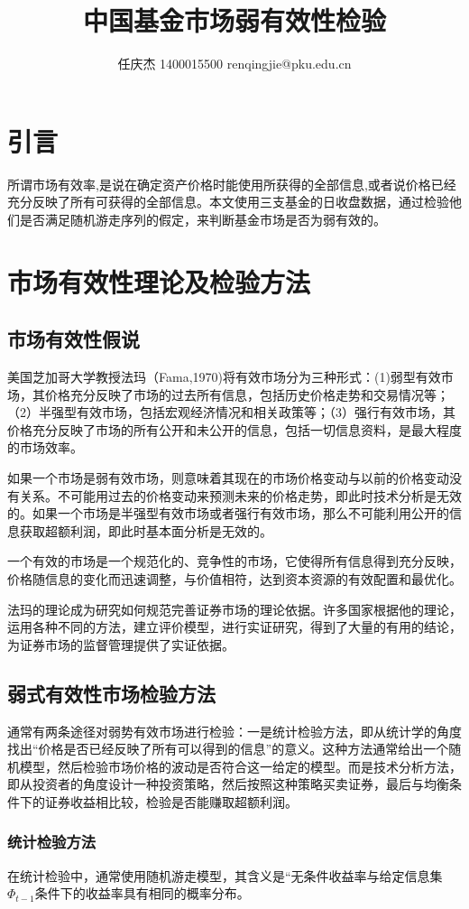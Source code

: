 \documentclass[11pt]{article}
\author{任庆杰 1400015500 renqingjie@pku.edu.cn}
\title{中国基金市场弱有效性检验}
\begin{document}
\maketitle
\section*{引言}
所谓市场有效率,是说在确定资产价格时能使用所获得的全部信息,或者说价格已经充分反映了所有可获得的全部信息。本文使用三支基金的日收盘数据，通过检验他们是否满足随机游走序列的假定，来判断基金市场是否为弱有效的。

\section{市场有效性理论及检验方法}
\subsection{市场有效性假说}
美国芝加哥大学教授法玛（Fama,1970)将有效市场分为三种形式：(1)弱型有效市场，其价格充分反映了市场的过去所有信息，包括历史价格走势和交易情况等；（2）半强型有效市场，包括宏观经济情况和相关政策等；（3）强行有效市场，其价格充分反映了市场的所有公开和未公开的信息，包括一切信息资料，是最大程度的市场效率。

如果一个市场是弱有效市场，则意味着其现在的市场价格变动与以前的价格变动没有关系。不可能用过去的价格变动来预测未来的价格走势，即此时技术分析是无效的。如果一个市场是半强型有效市场或者强行有效市场，那么不可能利用公开的信息获取超额利润，即此时基本面分析是无效的。

一个有效的市场是一个规范化的、竞争性的市场，它使得所有信息得到充分反映，价格随信息的变化而迅速调整，与价值相符，达到资本资源的有效配置和最优化。

法玛的理论成为研究如何规范完善证券市场的理论依据。许多国家根据他的理论，运用各种不同的方法，建立评价模型，进行实证研究，得到了大量的有用的结论，为证券市场的监督管理提供了实证依据。

\subsection{弱式有效性市场检验方法}
通常有两条途径对弱势有效市场进行检验：一是统计检验方法，即从统计学的角度找出“价格是否已经反映了所有可以得到的信息”的意义。这种方法通常给出一个随机模型，然后检验市场价格的波动是否符合这一给定的模型。而是技术分析方法，即从投资者的角度设计一种投资策略，然后按照这种策略买卖证券，最后与均衡条件下的证券收益相比较，检验是否能赚取超额利润。

\subsubsection{统计检验方法}
在统计检验中，通常使用随机游走模型，其含义是“无条件收益率与给定信息集$\Phi_{t-1}$条件下的收益率具有相同的概率分布。
\end{document}
